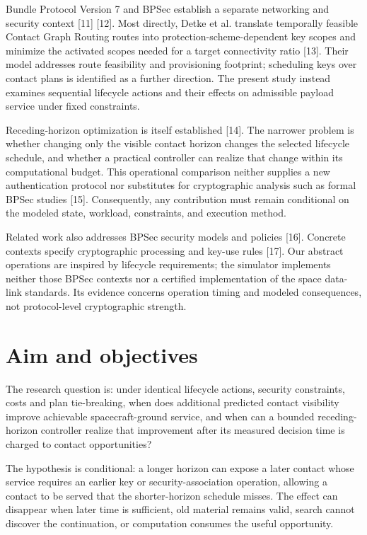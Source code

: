 \documentclass[12pt,a4paper]{article}
\begin{document}
Bundle Protocol Version 7 and BPSec establish a separate networking and security context [11] [12]. Most directly, Detke et al. translate temporally feasible Contact Graph Routing routes into protection-scheme-dependent key scopes and minimize the activated scopes needed for a target connectivity ratio [13]. Their model addresses route feasibility and provisioning footprint; scheduling keys over contact plans is identified as a further direction. The present study instead examines sequential lifecycle actions and their effects on admissible payload service under fixed constraints.

Receding-horizon optimization is itself established [14]. The narrower problem is whether changing only the visible contact horizon changes the selected lifecycle schedule, and whether a practical controller can realize that change within its computational budget. This operational comparison neither supplies a new authentication protocol nor substitutes for cryptographic analysis such as formal BPSec studies [15]. Consequently, any contribution must remain conditional on the modeled state, workload, constraints, and execution method.

Related work also addresses BPSec security models and policies [16]. Concrete contexts specify cryptographic processing and key-use rules [17]. Our abstract operations are inspired by lifecycle requirements; the simulator implements neither those BPSec contexts nor a certified implementation of the space data-link standards. Its evidence concerns operation timing and modeled consequences, not protocol-level cryptographic strength.

\section*{Aim and objectives}
The research question is: under identical lifecycle actions, security constraints, costs and plan tie-breaking, when does additional predicted contact visibility improve achievable spacecraft-ground service, and when can a bounded receding-horizon controller realize that improvement after its measured decision time is charged to contact opportunities?

The hypothesis is conditional: a longer horizon can expose a later contact whose service requires an earlier key or security-association operation, allowing a contact to be served that the shorter-horizon schedule misses. The effect can disappear when later time is sufficient, old material remains valid, search cannot discover the continuation, or computation consumes the useful opportunity.
\end{document}
